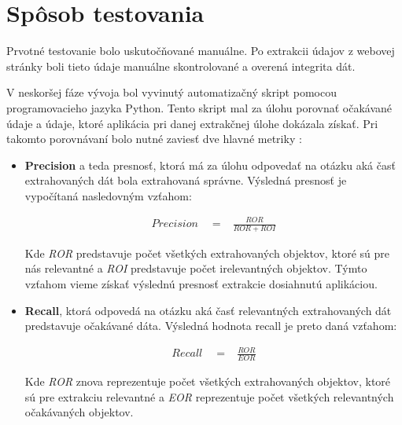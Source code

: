 \section{Spôsob testovania}
\label{sposobytestu}

Prvotné testovanie bolo uskutočňované manuálne. Po extrakcii údajov z webovej stránky boli tieto údaje manuálne skontrolované a overená integrita dát. 

V neskoršej fáze vývoja bol vyvinutý automatizačný skript pomocou programovacieho jazyka Python. Tento skript mal za úlohu porovnať očakávané údaje a údaje, ktoré aplikácia pri danej extrakčnej úlohe dokázala získať. Pri takomto porovnávaní bolo nutné zaviesť dve hlavné metriky \cite{precrecall}:

\begin{itemize}
    \item \textbf{Precision} a teda presnosť, ktorá má za úlohu odpovedať na otázku aká časť extrahovaných dát bola extrahovaná správne. Výsledná presnosť je vypočítaná nasledovným vzťahom:
    
    \begin{eqnarray}
    \label{preeq}
    Precision \quad = & {\displaystyle\frac{ROR}{ROR + ROI}}
    \end{eqnarray}
   
    Kde \textit{ROR} predstavuje počet všetkých extrahovaných objektov, ktoré sú pre nás relevantné a \textit{ROI} predstavuje počet irelevantných objektov. Týmto vzťahom vieme získať výslednú presnosť extrakcie dosiahnutú aplikáciou.
    
    \item \textbf{Recall}, ktorá odpovedá na otázku aká časť relevantných extrahovaných dát predstavuje očakávané dáta. Výsledná hodnota recall je preto daná vzťahom:
    
    \begin{eqnarray}
    \label{receq}
    Recall \quad = & {\displaystyle\frac{ROR}{EOR}}
    \end{eqnarray}
    
    Kde \textit{ROR} znova reprezentuje počet všetkých extrahovaných objektov, ktoré sú pre extrakciu relevantné a \textit{EOR} reprezentuje počet všetkých relevantných očakávaných objektov.
\end{itemize}

\bigskip

